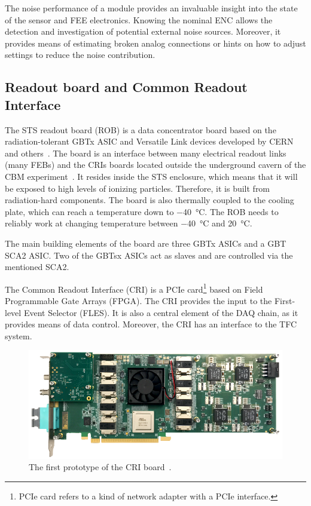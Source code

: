 The noise performance of a module provides an invaluable insight into the state of the sensor and \gls{FEE} electronics. Knowing the nominal \gls{ENC} allows the detection and investigation of potential external noise sources. Moreover, it provides means of estimating broken analog connections or hints on how to adjust settings to reduce the noise contribution.
\subsection{Readout board and Common Readout Interface}

The \gls{STS} readout board (\gls{ROB}) is a data concentrator board based on the radiation-tolerant GBTx ASIC and Versatile Link
devices developed by CERN and others~\cite{Bonacini:1235849, C_2013}. The board is an interface between many electrical readout links (many \glspl{FEB}) and the \glspl{CRI} boards located outside the underground cavern of the \gls{CBM} experiment~\cite{Lehnert_2017}. It resides inside the \gls{STS} enclosure, which means that it will be exposed to high levels of ionizing particles. Therefore, it is built from radiation-hard components. The board is also thermally coupled to the cooling plate, which can reach a temperature down to \SI{-40}{\celsius}. The \gls{ROB} needs to reliably work at changing temperature between \SI{-40}{\celsius} and \SI{20}{\celsius}. 

The main building elements of the board are three \gls{GBT}x \glspl{ASIC} and a \gls{GBT} \gls{SCA2} \gls{ASIC}. Two of the \glspl{GBT}x \glspl{ASIC} act as slaves and are controlled via the mentioned \gls{SCA2}. 

The Common Readout Interface (\gls{CRI}) is a PCIe card\footnote{PCIe card refers to a kind of network adapter with a PCIe interface.} based on Field Programmable Gate Arrays (\gls{FPGA}). The \gls{CRI} provides the input to the First-level Event Selector (\gls{FLES}). It is also a central element of the \gls{DAQ} chain, as it provides means of data control. Moreover, the \gls{CRI} has an interface to the \gls{TFC} system. 
\begin{figure}[!h]
\centering
\includegraphics[width=0.8\columnwidth]{Chapter2/images/cri_board_atlas.pdf}
\caption{The first prototype of the \gls{CRI} board~\cite{CRI}.}
\label{fig_cri_board}
\end{figure}

